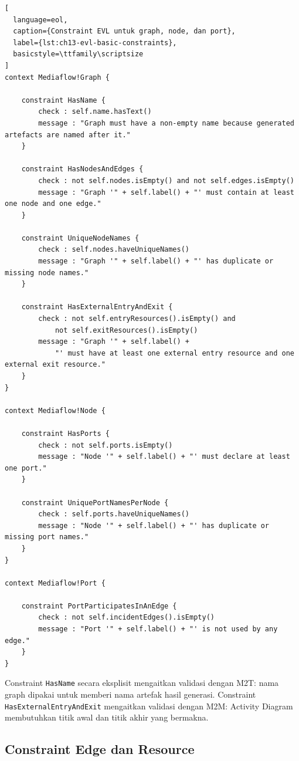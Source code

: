 \begin{lstlisting}[
  language=eol,
  caption={Constraint EVL untuk graph, node, dan port},
  label={lst:ch13-evl-basic-constraints},
  basicstyle=\ttfamily\scriptsize
]
context Mediaflow!Graph {

    constraint HasName {
        check : self.name.hasText()
        message : "Graph must have a non-empty name because generated artefacts are named after it."
    }

    constraint HasNodesAndEdges {
        check : not self.nodes.isEmpty() and not self.edges.isEmpty()
        message : "Graph '" + self.label() + "' must contain at least one node and one edge."
    }

    constraint UniqueNodeNames {
        check : self.nodes.haveUniqueNames()
        message : "Graph '" + self.label() + "' has duplicate or missing node names."
    }

    constraint HasExternalEntryAndExit {
        check : not self.entryResources().isEmpty() and
            not self.exitResources().isEmpty()
        message : "Graph '" + self.label() +
            "' must have at least one external entry resource and one external exit resource."
    }
}

context Mediaflow!Node {

    constraint HasPorts {
        check : not self.ports.isEmpty()
        message : "Node '" + self.label() + "' must declare at least one port."
    }

    constraint UniquePortNamesPerNode {
        check : self.ports.haveUniqueNames()
        message : "Node '" + self.label() + "' has duplicate or missing port names."
    }
}

context Mediaflow!Port {

    constraint PortParticipatesInAnEdge {
        check : not self.incidentEdges().isEmpty()
        message : "Port '" + self.label() + "' is not used by any edge."
    }
}
\end{lstlisting}

\noindent Constraint \texttt{HasName} secara eksplisit mengaitkan validasi dengan M2T: nama graph dipakai untuk memberi nama artefak hasil generasi. Constraint \texttt{HasExternalEntryAndExit} mengaitkan validasi dengan M2M: Activity Diagram membutuhkan titik awal dan titik akhir yang bermakna.

\subsection{Constraint Edge dan Resource}

